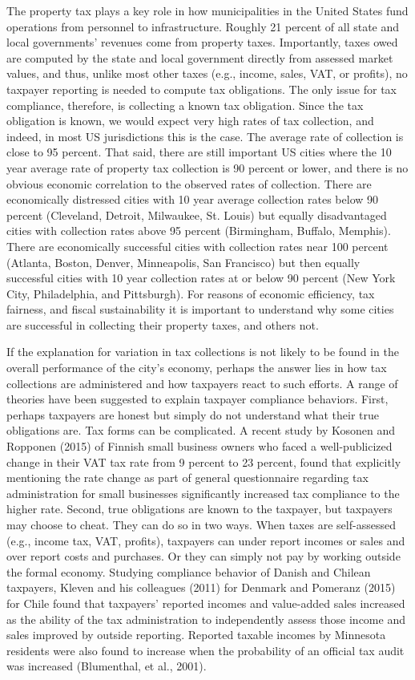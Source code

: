 \documentclass[12pt,titlepage]{article}
\begin{document}
The property tax plays a key role in how municipalities in the
United States fund operations from personnel to infrastructure.
Roughly 21 percent of all state and local governments’ revenues
come from property taxes.  Importantly, taxes owed are computed
by the state and local government directly from assessed market
values, and thus, unlike most other taxes (e.g., income, sales,
VAT, or profits), no taxpayer reporting is needed to compute tax
obligations.  The only issue for tax compliance, therefore, is
collecting a known tax obligation.  Since the tax obligation is
known, we would expect very high rates of tax collection, and
indeed, in most US jurisdictions this is the case.  The average
rate of collection is close to 95 percent.  That said, there are
still important US cities where the 10 year average rate of property
tax collection is 90 percent or lower, and there is no obvious
economic correlation to the observed rates of collection.  There
are economically distressed cities with 10 year average collection
rates below 90 percent (Cleveland, Detroit, Milwaukee, St. Louis)
but equally disadvantaged cities with collection rates above 95
percent (Birmingham, Buffalo, Memphis).   There are economically
successful cities with collection rates near 100 percent (Atlanta,
Boston, Denver, Minneapolis,  San Francisco) but then equally
successful cities with 10 year collection rates at or below 90
percent (New York City, Philadelphia, and Pittsburgh). For
reasons of economic efficiency, tax fairness, and fiscal
sustainability it is important to understand why some cities are
successful in collecting their property taxes, and others not.  

If the explanation for variation in tax collections is not likely
to be found in the overall performance of the city’s economy,
perhaps the answer lies in how tax collections are administered
and how taxpayers react to such efforts. A range of theories
have been suggested to explain taxpayer compliance behaviors. 
First, perhaps taxpayers are honest but simply do not understand
what their true obligations are. Tax forms can be complicated. 
A recent study by Kosonen and Ropponen (2015) of Finnish small
business owners who faced a well-publicized change in their VAT
tax rate from 9 percent to 23 percent, found that explicitly
mentioning the rate change as part of general questionnaire
regarding tax administration for small businesses significantly
increased tax compliance to the higher rate.  Second,
true obligations are known to the taxpayer, but taxpayers may
choose to cheat.  They can do so in two ways.  When taxes are
self-assessed (e.g., income tax, VAT, profits), taxpayers can
under report incomes or sales and over report costs and purchases. 
Or they can simply not pay by working outside the formal economy. 
Studying compliance behavior of Danish and Chilean taxpayers, 
Kleven and his colleagues (2011) for Denmark and Pomeranz (2015)
for Chile found that taxpayers’ reported incomes and value-added
sales increased as the ability of the tax administration to
independently assess those income and sales improved by outside
reporting.   Reported taxable incomes by Minnesota residents were
also found to increase when the probability of an official tax audit
was increased (Blumenthal, et al., 2001).  
\end{document}
